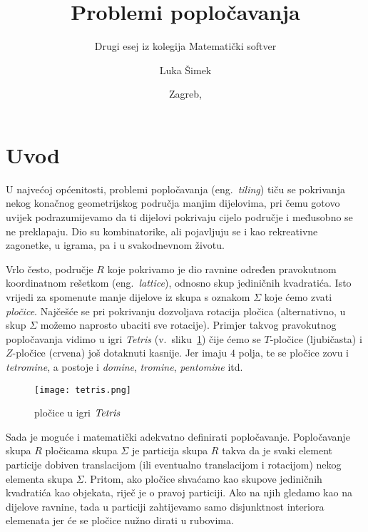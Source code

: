 \documentclass[11pt]{scrartcl}
\date{\displaydate{date}}
\begin{document}
\title{Problemi popločavanja}
\subtitle{Drugi esej iz kolegija Matematički softver}
\author{Luka Šimek}
\date{Zagreb, }
\maketitle
\tableofcontents


\section{Uvod}
U najvećoj općenitosti, problemi popločavanja (eng.\ \textsl{tiling}) tiču se pokrivanja nekog konačnog geometrijskog područja manjim dijelovima, pri čemu gotovo uvijek podrazumijevamo da ti dijelovi pokrivaju cijelo područje i međusobno se ne preklapaju. Dio su kombinatorike, ali pojavljuju se i kao rekreativne zagonetke, u igrama, pa i u sva\-ko\-dnev\-nom životu.

Vrlo često, područje $R$ koje pokrivamo je dio ravnine određen pravokutnom koordinatnom rešetkom (eng.\ \textsl {lattice}), odnosno skup jediničnih kvadratića. Isto vrijedi za spomenute manje dije\-lo\-ve iz skupa s oznakom $\Sigma$ koje ćemo zvati \emph{pločice}. Najčešće se pri pokrivanju dozvoljava rotacija pločica (alternativno, u skup $\Sigma$ možemo naprosto ubaciti sve rotacije). Primjer takvog pravokutnog popločavanja vidimo u igri \emph{Tetris} (v.\ sliku~\ref{fig:tetris}) čije ćemo se $T$-pločice (ljubičasta) i $Z$-pločice (crvena) još dotaknuti kasnije. Jer imaju $4$ polja, te se pločice zovu i \emph{tetromine}, a postoje i \emph{domine}, \emph{tromine}, \emph{pentomine} itd.

\begin{figure}[h!]
    \centering
    \texttt{[image: tetris.png]}
    \label{fig:tetris}
    \caption{pločice u igri $\emph{Tetris}$}
\end{figure}

Sada je moguće i matematički adekvatno definirati popločavanje. Popločavanje skupa $R$ pločicama skupa $\Sigma$ je particija skupa $R$ takva da je svaki element particije dobiven translacijom (ili eventualno translacijom i rotacijom) nekog elementa skupa $\Sigma$. Pritom, ako pločice shvaćamo kao skupove jediničnih kvadratića kao objekata, riječ je o pravoj particiji. Ako na njih gledamo kao na dijelove ravnine, tada u particiji zahtijevamo samo disjunktnost interiora elemenata jer će se pločice nužno dirati u rubovima.
\end{document}

